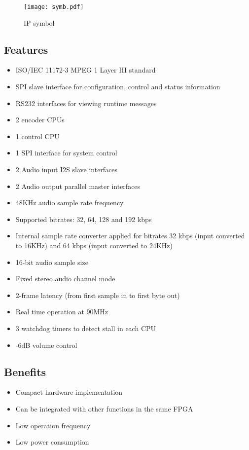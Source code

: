 \documentclass{rep}
\theoremstyle{plain}
\begin{document}
\begin{figure}[h]
  \begin{center}
    \texttt{[image: symb.pdf]}
    \caption{IP symbol}
    \label{fig:symb}
  \end{center}
\end{figure}
\clearpage

\subsection{Features}

\begin{itemize}
\item ISO/IEC 11172-3 MPEG 1 Layer III standard
\item SPI slave interface for configuration, control and status information
\item RS232 interfaces for viewing runtime messages
\item 2 encoder CPUs
\item 1 control CPU
\item 1 SPI interface for system control 
\item 2 Audio input I2S slave interfaces
\item 2 Audio output parallel master interfaces
\item 48KHz audio sample rate frequency
\item Supported bitrates: 32, 64, 128 and 192 kbps
\item Internal sample rate converter applied for bitrates 32 kbps (input
  converted to 16KHz) and 64 kbps (input converted to 24KHz)
\item 16-bit audio sample size
\item Fixed stereo audio channel mode
\item 2-frame latency (from first sample in to first byte out)
\item Real time operation at 90MHz
\item 3 watchdog timers to detect stall in each CPU
\item -6dB volume control
\end{itemize}

\subsection{Benefits}
\begin{itemize}
\item Compact hardware implementation
\item Can be integrated with other functions in the same FPGA
\item Low operation frequency
\item Low power consumption
\end{itemize}
\end{document}
